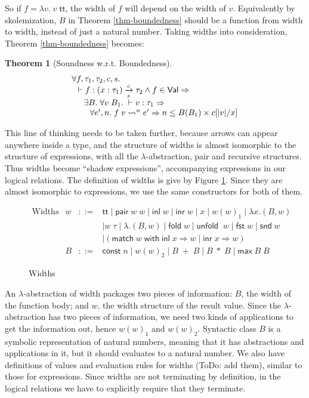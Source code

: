 \documentclass[preprint]{sigplanconf}
\newcommand{\arrow}[4]{#1\xrightarrow[#3]{#2}#4}
\newcommand{\symmatch}{\mathsf{match}}
\newcommand{\symwith}{\mathsf{\;with\;}}
\newcommand{\syminl}{\mathsf{inl}}
\newcommand{\syminr}{\mathsf{inr}}
\newcommand{\symmax}{\mathsf{max}}
\newcommand{\symfold}{\mathsf{fold\;}}
\newcommand{\symunfold}{\mathsf{unfold\;}}
\newcommand{\sympair}{\mathsf{pair}}
\newcommand{\symtt}{\mathsf{tt}}
\newcommand{\symfst}{\mathsf{fst}}
\newcommand{\symsnd}{\mathsf{snd}}
\newtheorem{thm}{Theorem}
\begin{document}
So if $f=\lambda v.\; v\;\symtt$, the width of $f$ will depend on the width of $v$. Equivalently by skolemization, $B$ in Theorem \ref{thm-boundedness} should be a function from width to width, instead of just a natural number. Taking widths into consideration, Theorem \ref{thm-boundedness} becomes:

\begin{thm}[\label{thm-boundedness'}Soundness w.r.t. Boundedness]
$$
\begin{array}{l}
\forall f,\tau_1,\tau_2,c,s. \\
\hspace{0.1in} \vdash f:\arrow{(x:\tau_1)}{c}{s}{\tau_2} \wedge f\in\mathsf{Val}\Rightarrow \\
\hspace{0.2in} \exists B. \;\forall v\;B_1.\; \vdash v:\tau_1 \Rightarrow \\
\hspace{0.3in} \forall e',n.\; f\;v\leadsto^n e' \Rightarrow n\leq B(B_1)\times c[|v|/x]
\end{array}
$$
\end{thm}

This line of thinking needs to be taken further, because arrows can appear anywhere inside a type, and the structure of widths is almost isomorphic to the structure of expressions, with all the $\lambda$-abstraction, pair and recursive structures. Thus widths become ``shadow expressions'', accompanying expressions in our logical relations. The definition of widths is give by Figure \ref{widths}. Since they are almost isomorphic to expressions, we use the same constructors for both of them.

\begin{figure}
$$\begin{array}{rrcl}
  \textrm{Widths} & w &::=& \symtt \mid \sympair\;w\;w \mid \syminl\;w \mid \syminr\;w \mid x \mid w(w)_1 \mid \lambda x.(B,w) \\
  & & & \mid w\;\tau \mid \lambda.(B,w) \mid \symfold w \mid \symunfold\;w \mid \symfst\;w \mid \symsnd\;w \\
  & & & \mid (\symmatch\;w \symwith\syminl\;x\Rightarrow w\;|\;\syminr\;x\Rightarrow w) \\
  & B &::=& \mathsf{const}\;n \mid w(w)_2 \mid B\;+\;B \mid B\;*\;B \mid \symmax\;B\;B
\end{array}$$
\caption{\label{widths}Widths}
\end{figure}

An $\lambda$-abstraction of width packages two pieces of information: $B$, the width of the function body; and $w$, the width structure of the result value. Since the $\lambda$-abstraction has two pieces of information, we need two kinds of applications to get the information out, hence $w(w)_1$ and $w(w)_2$. Syntactic class $B$ is a symbolic representation of natural numbers, meaning that it has abstractions and applications in it, but it should evaluates to a natural number. We also have definitions of values and evaluation rules for widths (ToDo: add them), similar to those for expressions. Since widths are not terminating by definition, in the logical relations we have to explicitly require that they terminate.
\end{document}
